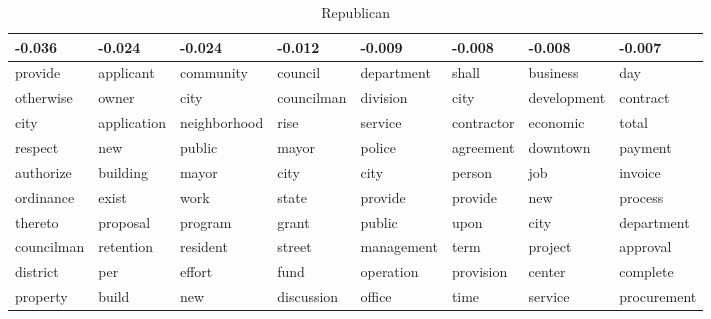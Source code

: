 \begin{table}[ht]
\centering
\begingroup\tiny
\begin{tabular}{llllllll}
  \hline
-0.036 & -0.024 & -0.024 & -0.012 & -0.009 & -0.008 & -0.008 & -0.007 \\ 
  \hline
provide & applicant & community & council & department & shall & business & day \\ 
  otherwise & owner & city & councilman & division & city & development & contract \\ 
  city & application & neighborhood & rise & service & contractor & economic & total \\ 
  respect & new & public & mayor & police & agreement & downtown & payment \\ 
  authorize & building & mayor & city & city & person & job & invoice \\ 
  ordinance & exist & work & state & provide & provide & new & process \\ 
  thereto & proposal & program & grant & public & upon & city & department \\ 
  councilman & retention & resident & street & management & term & project & approval \\ 
  district & per & effort & fund & operation & provision & center & complete \\ 
  property & build & new & discussion & office & time & service & procurement \\ 
   \hline
\end{tabular}
\endgroup
\caption{Republican} 
\label{tabSTMIN_LADem}
\end{table}

